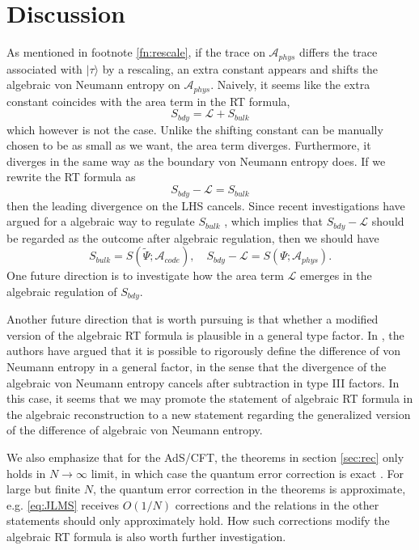 \documentclass[a4paper,11pt]{article}
\newcommand{\ket}[1]{| #1 \rangle } %
\renewcommand{\=}[1]{\stackrel{#1}{=}} %
\def\A{\mathcal{A}}
\begin{document}
\section{Discussion}\label{sec:discussions}
As mentioned in footnote \ref{fn:rescale}, if the trace on $\A_{phys}$ differs the trace associated with $\ket{\tau}$ by a rescaling, an extra constant appears and shifts the algebraic von Neumann entropy on $\A_{phys}$. Naively, it seems like the extra constant coincides with the area term in the RT formula, 
\begin{equation}
	S_{bdy}=\mathcal{L}+S_{bulk}
\end{equation}
which however is not the case. Unlike the shifting constant can be manually chosen to be as small as we want, the area term diverges. Furthermore, it diverges in the same way as the boundary von Neumann entropy does. If we rewrite the RT formula as
\begin{equation}
	S_{bdy}-\mathcal{L}=S_{bulk}
\end{equation}
then the leading divergence on the LHS cancels. Since recent investigations have argued for a algebraic way to regulate $S_{bulk}$ \cite{Witten:2021unn,Chandrasekaran:2022cip,Jensen:2023yxy,Kudler-Flam:2023hkl,Colafranceschi:2023urj,Faulkner:2024gst}, which implies that $S_{bdy}-\mathcal{L}$ should be regarded as the outcome after algebraic regulation, then we should have
\begin{equation}
	S_{bulk}=S(\tilde{\Psi};\A_{code}),\quad S_{bdy}-\mathcal{L}=S(\Psi;\A_{phys}).
\end{equation}
One future direction is to investigate how the area term $\mathcal{L}$ emerges in the algebraic regulation of $S_{bdy}$.

Another future direction that is worth pursuing is that whether a modified version of the algebraic RT formula is plausible in a general type factor. In \cite{Kudler-Flam:2023hkl}, the authors have argued that it is possible to rigorously define the difference of von Neumann entropy in a general factor, in the sense that the divergence of the algebraic von Neumann entropy cancels after subtraction in type III factors. In this case, it seems that we may promote the statement of algebraic RT formula in the algebraic reconstruction to a new statement regarding the generalized version of the difference of algebraic von Neumann entropy.

We also emphasize that for the AdS/CFT, the theorems in section \ref{sec:rec} only holds in $N\rightarrow\infty$ limit, in which case the quantum error correction is exact \cite{Cotler:2017erl}. For large but finite $N$, the quantum error correction in the theorems is approximate, e.g. \eqref{eq:JLMS} receives $O(1/N)$ corrections \cite{Cotler:2017erl,Jafferis:2015del} and the relations in the other statements should only approximately hold. How such corrections modify the algebraic RT formula is also worth further investigation.
\end{document}
